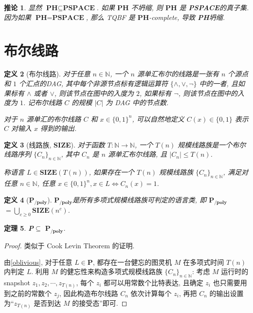 \documentclass[8pt]{article}
\theoremstyle{compact}
\newtheorem{theorem}{定理}[section]
\newtheorem{definition}[theorem]{定义}
\newtheorem{corollary}[theorem]{推论}
\def\le{\leqslant}
\def\ge{\geqslant}
\def\P{\textbf{P}}
\def\PSPACE{\textbf{PSPACE}}
\def\PH{\textbf{PH}}
\def\SIZE{\textbf{SIZE}}
\def\PPOLY{$\textbf{P}_{\textbf{/poly}}$}
\begin{document}
\begin{corollary}
	显然 $\PH \subseteq \PSPACE$. 如果 $\PH$ 不坍缩, 则 $\PH$ 是 \PSPACE 的真子集. 因为如果 $\PH = \PSPACE$, 那么 \textsf{TQBF} 是 $\PH$-complete, 导致 \PH 坍缩.
\end{corollary}

\section{布尔线路}
\begin{definition}[布尔线路]
	对于任意 $n \in \mathbb N$, 一个 $n$ 源单汇布尔的线路是一张有 $n$ 个源点和 $1$ 个汇点的DAG, 其中每个非源节点标有逻辑运算符 $\{\wedge, \vee, \lnot\}$ 中的一者, 且如果标有 $\wedge$ 或者 $\vee$, 则该节点在图中的入度为 $2$, 如果标有 $\lnot$, 则该节点在图中的入度为 $1$. 记布尔线路 $C$ 的规模 $|C|$ 为 DAG 中的节点数.

	对于 $n$ 源单汇的布尔线路 $C$ 和 $x \in \{0, 1\}^n$, 可以自然地定义 $C(x) \in \{0, 1\}$ 表示 $C$ 对输入 $x$ 得到的输出. 
\end{definition}
\begin{definition}[线路族, \SIZE]
	对于函数 $T : \mathbb N \to \mathbb N$, 一个 $T(n)$ 规模线路族是一个布尔线路序列 $\{C_n\}_{n \in \mathbb N}$, 其中 $C_n$ 是 $n$ 源单汇布尔线路, 且 $|C_n| \le T(n)$.

	称语言 $L \in \SIZE(T(n))$, 如果存在一个 $T(n)$ 规模线路族 $\{C_n\}_{n \in \mathbb N}$, 满足对任意 $n \in \mathbb N$, 任意 $x \in \{0, 1\}^n, x \in L \Leftrightarrow C_n(x) = 1$.
\end{definition}
\begin{definition}[\PPOLY]
	\PPOLY 是所有多项式规模线路族可判定的语言类, 即 \PPOLY $ = \bigcup_{c \ge 0} \SIZE(n^c)$.
\end{definition}
\begin{theorem}
	\P $\subseteq$ \PPOLY.
	\label{P_subset_PPOLY}
\end{theorem}
\begin{proof}
	类似于 Cook Levin Theorem 的证明.

	由\cref{oblivious}, 对于任意 $L \in \P$, 都存在一台健忘的图灵机 $M$ 在多项式时间 $T(n)$ 内判定 $L$. 利用 $M$ 的健忘性来构造多项式规模线路族 $\{C_n\}_{n \in \mathbb N}$: 考虑 $M$ 运行时的 snapshot $z_1, z_2, \cdots, z_{T(n)}$, 每个 $z_i$ 都可以用常数个比特表达, 且确定 $z_i$ 也只需要用到之前的常数个 $z_j$, 因此构造布尔线路 $C_n$ 依次计算每个 $z_i$, 再把 $C_n$ 的输出设置为“$z_{T(n)}$ 是否到达 $M$ 的接受态”即可.
\end{proof}
\end{document}
